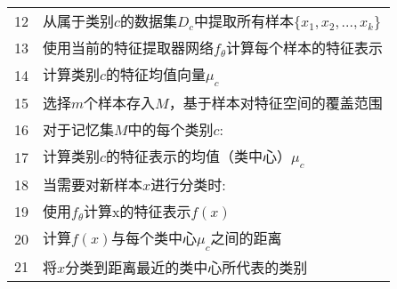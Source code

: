 \begin{table}[htbp]
\begin{tabularx}{1.0\textwidth}{cl}
		12 & \quad\quad\quad\quad 从属于类别$c$的数据集$D_c$中提取所有样本$\{x_1, x_2, ..., x_k\}$            \\
		13 & \quad\quad\quad\quad 使用当前的特征提取器网络$f_{\theta}$计算每个样本的特征表示                         \\
		14 & \quad\quad\quad\quad 计算类别$c$的特征均值向量$\mu_c$                                       \\
		15 & \quad\quad\quad\quad 选择$m$个样本存入$M$，基于样本对特征空间的覆盖范围                                \\
		16 & \quad\quad 对于记忆集$M$中的每个类别$c$:                                                    \\
		17 & \quad\quad\quad\quad 计算类别$c$的特征表示的均值（类中心）$\mu_c$                                 \\
		18 & \quad\quad 当需要对新样本$x$进行分类时:                                                      \\
		19 & \quad\quad\quad\quad 使用$f_{\theta}$计算x的特征表示$f(x)$                                \\
		20 & \quad\quad\quad\quad 计算$f(x)$与每个类中心$\mu_c$之间的距离                                  \\
		21 & \quad\quad\quad\quad 将$x$分类到距离最近的类中心所代表的类别                                       \\
		\bottomrule
	\end{tabularx}
\end{table}
